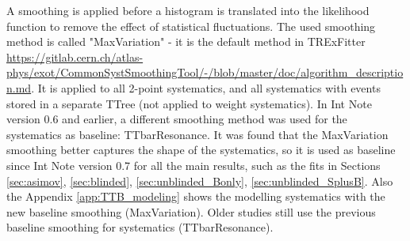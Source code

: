 A smoothing is applied before a histogram is translated into the likelihood function to remove the effect of statistical fluctuations. The used smoothing method is called "MaxVariation" - it is the default method in TRExFitter \href{https://gitlab.cern.ch/atlas-phys/exot/CommonSystSmoothingTool/-/blob/master/doc/algorithm_description.md}{https://gitlab.cern.ch/atlas-phys/exot/CommonSystSmoothingTool/-/blob/master/doc/algorithm\_description.md}. It is applied to all 2-point systematics, and all systematics with events stored in a separate TTree (not applied to weight systematics). In Int Note version 0.6 and earlier, a different smoothing method was used for the \ttbar systematics as baseline: TTbarResonance. It was found that the MaxVariation smoothing better captures the shape of the \ttbar systematics, so it is used as baseline since Int Note version 0.7 for all the main results, such as the fits in Sections \ref{sec:asimov}, \ref{sec:blinded}, \ref{sec:unblinded_Bonly}, \ref{sec:unblinded_SplusB}. Also the Appendix \ref{app:TTB_modeling} shows the \ttbar modelling systematics with the new baseline smoothing (MaxVariation). Older studies still use the previous baseline smoothing for \ttbar systematics (TTbarResonance).

